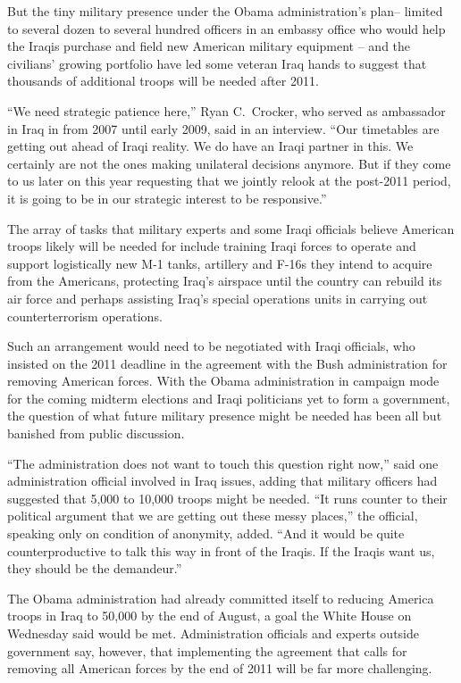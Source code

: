 ﻿\documentclass[12pt]{article}
\begin{document}
But the tiny military presence under the Obama administration's plan-- limited to several dozen to
several hundred officers in an embassy office who would help the Iraqis purchase and field new
American military equipment -- and the civilians' growing portfolio have led some veteran Iraq hands
to suggest that thousands of additional troops will be needed after 2011.

``We need strategic patience here,'' Ryan C.~Crocker, who served as ambassador in Iraq in from 2007
until early 2009, said in an interview. ``Our timetables are getting out ahead of Iraqi reality. We
do have an Iraqi partner in this. We certainly are not the ones making unilateral decisions anymore.
But if they come to us later on this year requesting that we jointly relook at the post-2011 period,
it is going to be in our strategic interest to be responsive.''

The array of tasks that military experts and some Iraqi officials believe American troops likely
will be needed for include training Iraqi forces to operate and support logistically new M-1 tanks,
artillery and F-16s they intend to acquire from the Americans, protecting Iraq's airspace until the
country can rebuild its air force and perhaps assisting Iraq's special operations units in carrying
out counterterrorism operations.

Such an arrangement would need to be negotiated with Iraqi officials, who insisted on the 2011
deadline in the agreement with the Bush administration for removing American forces. With the Obama
administration in campaign mode for the coming midterm elections and Iraqi politicians yet to form a
government, the question of what future military presence might be needed has been all but banished
from public discussion.

``The administration does not want to touch this question right now,'' said one administration
official involved in Iraq issues, adding that military officers had suggested that 5,000 to 10,000
troops might be needed. ``It runs counter to their political argument that we are getting out these
messy places,'' the official, speaking only on condition of anonymity, added. ``And it would be
quite counterproductive to talk this way in front of the Iraqis. If the Iraqis want us, they should
be the demandeur.''

The Obama administration had already committed itself to reducing America troops in Iraq to 50,000
by the end of August, a goal the White House on Wednesday said would be met. Administration
officials and experts outside government say, however, that implementing the agreement that calls
for removing all American forces by the end of 2011 will be far more challenging.
\end{document}
